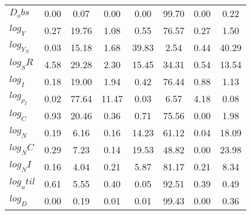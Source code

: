 \begin{center}
\begin{longtable}{lccccccc}
$D_obs     $	 & 	        0.00	 & 	        0.07	 & 	        0.00	 & 	        0.00	 & 	       99.70	 & 	        0.00	 & 	        0.22 \\ 
$log_Y     $	 & 	        0.27	 & 	       19.76	 & 	        1.08	 & 	        0.55	 & 	       76.57	 & 	        0.27	 & 	        1.50 \\ 
$log_Y_N   $	 & 	        0.03	 & 	       15.18	 & 	        1.68	 & 	       39.83	 & 	        2.54	 & 	        0.44	 & 	       40.29 \\ 
$log_SR    $	 & 	        4.58	 & 	       29.28	 & 	        2.30	 & 	       15.45	 & 	       34.31	 & 	        0.54	 & 	       13.54 \\ 
$log_I     $	 & 	        0.18	 & 	       19.00	 & 	        1.94	 & 	        0.42	 & 	       76.44	 & 	        0.88	 & 	        1.13 \\ 
$log_p_I   $	 & 	        0.02	 & 	       77.64	 & 	       11.47	 & 	        0.03	 & 	        6.57	 & 	        4.18	 & 	        0.08 \\ 
$log_C     $	 & 	        0.93	 & 	       20.46	 & 	        0.36	 & 	        0.71	 & 	       75.56	 & 	        0.00	 & 	        1.98 \\ 
$log_N     $	 & 	        0.19	 & 	        6.16	 & 	        0.16	 & 	       14.23	 & 	       61.12	 & 	        0.04	 & 	       18.09 \\ 
$log_NC    $	 & 	        0.29	 & 	        7.23	 & 	        0.14	 & 	       19.53	 & 	       48.82	 & 	        0.00	 & 	       23.98 \\ 
$log_NI    $	 & 	        0.16	 & 	        4.04	 & 	        0.21	 & 	        5.87	 & 	       81.17	 & 	        0.21	 & 	        8.34 \\ 
$log_util  $	 & 	        0.61	 & 	        5.55	 & 	        0.40	 & 	        0.05	 & 	       92.51	 & 	        0.39	 & 	        0.49 \\ 
$log_D     $	 & 	        0.00	 & 	        0.19	 & 	        0.01	 & 	        0.01	 & 	       99.43	 & 	        0.00	 & 	        0.36 \\ 
\end{longtable}
 \end{center}
